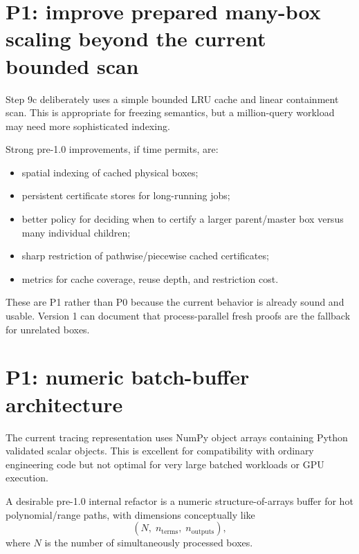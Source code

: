 \documentclass[11pt]{article}
\begin{document}
\section{P1: improve prepared many-box scaling beyond the current bounded scan}

Step 9c deliberately uses a simple bounded LRU cache and linear containment scan.
This is appropriate for freezing semantics, but a million-query workload may need
more sophisticated indexing.

Strong pre-1.0 improvements, if time permits, are:
\begin{itemize}[leftmargin=*]
\item spatial indexing of cached physical boxes;
\item persistent certificate stores for long-running jobs;
\item better policy for deciding when to certify a larger parent/master box versus
many individual children;
\item sharp restriction of pathwise/piecewise cached certificates;
\item metrics for cache coverage, reuse depth, and restriction cost.
\end{itemize}

These are P1 rather than P0 because the current behavior is already sound and
usable.  Version 1 can document that process-parallel fresh proofs are the fallback
for unrelated boxes.

\section{P1: numeric batch-buffer architecture}

The current tracing representation uses NumPy object arrays containing Python
validated scalar objects.  This is excellent for compatibility with ordinary
engineering code but not optimal for very large batched workloads or GPU
execution.

A desirable pre-1.0 internal refactor is a numeric structure-of-arrays buffer for
hot polynomial/range paths, with dimensions conceptually like
\[
  (N,\;n_{\mathrm{terms}},\;n_{\mathrm{outputs}}),
\]
where \(N\) is the number of simultaneously processed boxes.
\end{document}
